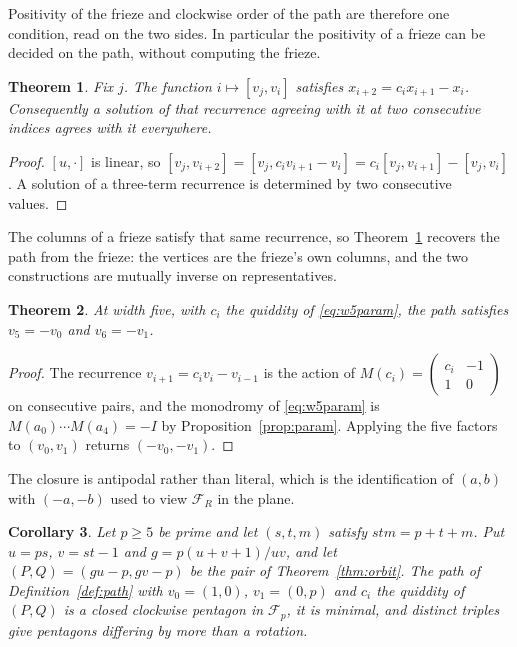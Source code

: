 \documentclass[11pt]{article}
\theoremstyle{plain}
\newtheorem{theorem}{Theorem}[section]
\newtheorem{corollary}[theorem]{Corollary}
\theoremstyle{definition}
\begin{document}
Positivity of the frieze and clockwise order of the path are therefore one condition, read
on the two sides. In particular the positivity of a frieze can be decided on the path,
without computing the frieze.

\begin{theorem}\label{thm:pathback}
Fix $j$. The function $i\mapsto[v_j,v_i]$ satisfies $x_{i+2}=c_ix_{i+1}-x_i$. Consequently a
solution of that recurrence agreeing with it at two consecutive indices agrees with it
everywhere.
\end{theorem}

\begin{proof}
$[u,\cdot]$ is linear, so $[v_j,v_{i+2}]=[v_j,c_iv_{i+1}-v_i]=c_i[v_j,v_{i+1}]-[v_j,v_i]$.
A solution of a three-term recurrence is determined by two consecutive values.
\end{proof}

The columns of a frieze satisfy that same recurrence, so Theorem~\ref{thm:pathback} recovers
the path from the frieze: the vertices are the frieze's own columns, and the two
constructions are mutually inverse on representatives.

\begin{theorem}\label{thm:pentclose}
At width five, with $c_i$ the quiddity of \eqref{eq:w5param}, the path satisfies $v_5=-v_0$
and $v_6=-v_1$.
\end{theorem}

\begin{proof}
The recurrence $v_{i+1}=c_iv_i-v_{i-1}$ is the action of
$M(c_i)=\left(\begin{smallmatrix}c_i&-1\\1&0\end{smallmatrix}\right)$ on consecutive pairs,
and the monodromy of \eqref{eq:w5param} is $M(a_0)\cdots M(a_4)=-I$ by
Proposition~\ref{prop:param}. Applying the five factors to $(v_0,v_1)$ returns $(-v_0,-v_1)$.
\end{proof}

The closure is antipodal rather than literal, which is the identification of $(a,b)$ with
$(-a,-b)$ used to view $\mathcal F_R$ in the plane.

\begin{corollary}\label{cor:fordpent}
Let $p\ge5$ be prime and let $(s,t,m)$ satisfy $stm=p+t+m$. Put $u=ps$, $v=st-1$ and
$g=p(u+v+1)/uv$, and let $(P,Q)=(gu-p,gv-p)$ be the pair of Theorem~\ref{thm:orbit}. The
path of Definition~\ref{def:path} with $v_0=(1,0)$, $v_1=(0,p)$ and $c_i$ the quiddity of
$(P,Q)$ is a closed clockwise pentagon in $\mathcal F_p$, it is minimal, and distinct
triples give pentagons differing by more than a rotation.
\end{corollary}
\end{document}
